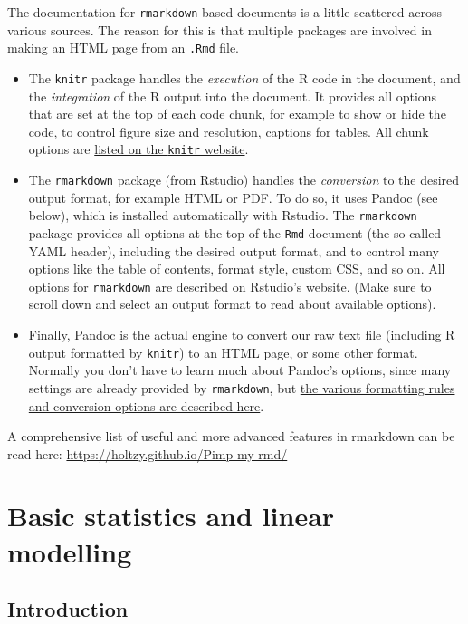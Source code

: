 \documentclass[]{book}
\providecommand{\tightlist}{%
  \setlength{\itemsep}{0pt}\setlength{\parskip}{0pt}}
\let\BeginKnitrBlock\begin \let\EndKnitrBlock\end
\begin{document}
The documentation for \texttt{rmarkdown} based documents is a little scattered across various sources. The reason for this is that multiple packages are involved in making an HTML page from an \texttt{.Rmd} file.

\begin{itemize}
\tightlist
\item
  The \texttt{knitr} package handles the \emph{execution} of the R code in the document, and the \emph{integration} of the R output into the document. It provides all options that are set at the top of each code chunk, for example to show or hide the code, to control figure size and resolution, captions for tables. All chunk options are \href{https://yihui.name/knitr/options/}{listed on the \texttt{knitr} website}.
\item
  The \texttt{rmarkdown} package (from Rstudio) handles the \emph{conversion} to the desired output format, for example HTML or PDF. To do so, it uses Pandoc (see below), which is installed automatically with Rstudio. The \texttt{rmarkdown} package provides all options at the top of the \texttt{Rmd} document (the so-called YAML header), including the desired output format, and to control many options like the table of contents, format style, custom CSS, and so on. All options for \texttt{rmarkdown} \href{https://rmarkdown.rstudio.com/}{are described on Rstudio's website}. (Make sure to scroll down and select an output format to read about available options).
\item
  Finally, Pandoc is the actual engine to convert our raw text file (including R output formatted by \texttt{knitr}) to an HTML page, or some other format. Normally you don't have to learn much about Pandoc's options, since many settings are already provided by \texttt{rmarkdown}, but \href{https://pandoc.org/MANUAL.html}{the various formatting rules and conversion options are described here}.
\end{itemize}

\BeginKnitrBlock{rmdreading}
A comprehensive list of useful and more advanced features in rmarkdown can be read here: \url{https://holtzy.github.io/Pimp-my-rmd/}
\EndKnitrBlock{rmdreading}

\hypertarget{linmodel}{%
\chapter{Basic statistics and linear modelling}\label{linmodel}}

\hypertarget{introduction-2}{%
\section{Introduction}\label{introduction-2}}
\end{document}
